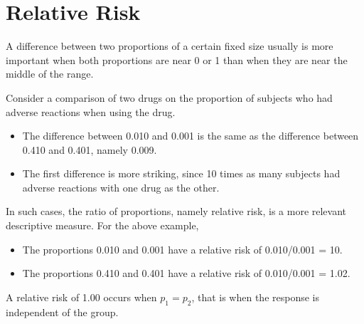 \section{Relative Risk}
A difference between two proportions of a certain fixed size usually is
more important when both proportions are near 0 or 1 than when
they are near the middle of the range.

Consider a comparison of two drugs on the proportion of
subjects who had adverse reactions when using the drug.
\begin{itemize}
	\item The difference between 0.010 and 0.001 is the same as the
difference between 0.410 and 0.401, namely 0.009.
	\item The first difference is more striking, since 10 times as many
subjects had adverse reactions with one drug as the other.
\end{itemize}

In such cases, the ratio of proportions, namely relative risk, is a more relevant descriptive measure. For the above example,

\begin{itemize}
	\item The proportions 0.010 and 0.001 have a relative risk of 0.010/0.001 = 10.
	\item The proportions 0.410 and 0.401 have a relative risk of 0.010/0.001 = 1.02.
\end{itemize}

A relative risk of 1.00 occurs when $p_1 = p_2$, that is when the response is independent of the group.

